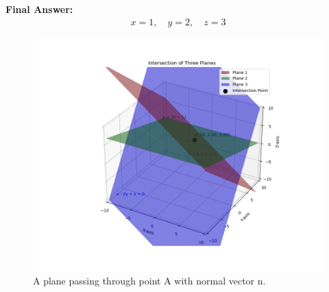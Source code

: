 \documentclass[journal,12pt]{IEEEtran}
\begin{document}
\textbf{Final Answer:}
\begin{align}
\boxed{x = 1,\quad y = 2,\quad z = 3}
\end{align}

\begin{figure}[h!]
\begin{center}
\includegraphics[width=\columnwidth]{figs/fig.png}
\end{center}
\caption{A plane passing through point A with normal vector n.}
\label{fig:Fig.1}
\end{figure}
\end{document}
